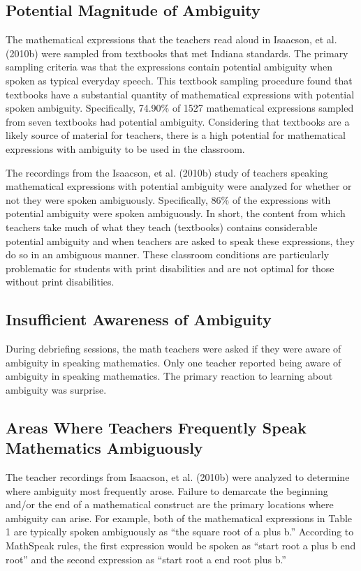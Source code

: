 \documentclass[11.5pt]{sig-alternate} %
\begin{document}
\begin{large}
\subsection*{Potential Magnitude of Ambiguity}
The mathematical expressions that the teachers read aloud in Isaacson, et al. (2010b) were sampled from textbooks that met Indiana standards. The primary sampling criteria was that the expressions contain potential ambiguity when spoken as typical everyday speech. This textbook sampling procedure found that textbooks have a substantial quantity of mathematical expressions with potential spoken ambiguity. Specifically, 74.90\% of 1527 mathematical expressions sampled from seven textbooks had potential ambiguity. Considering that textbooks are a likely source of material for teachers, there is a high potential for mathematical expressions with ambiguity to be used in the classroom.

The recordings from the Isaacson, et al. (2010b) study of teachers speaking mathematical expressions with potential ambiguity were analyzed for whether or not they were spoken ambiguously. Specifically, 86\% of the expressions with potential ambiguity were spoken ambiguously. In short, the content from which teachers take much of what they teach (textbooks) contains considerable potential ambiguity and when teachers are asked to speak these expressions, they do so in an ambiguous manner. These classroom conditions are particularly problematic for students with print disabilities and are not optimal for those without print disabilities. 

\subsection*{Insufficient Awareness of Ambiguity}
During debriefing sessions, the math teachers were asked if they were aware of ambiguity in speaking mathematics. Only one teacher reported being aware of ambiguity in speaking mathematics. The primary reaction to learning about ambiguity was surprise.

\subsection*{Areas Where Teachers Frequently Speak Mathematics Ambiguously}
The teacher recordings from Isaacson, et al. (2010b) were analyzed to determine where ambiguity most frequently arose. Failure to demarcate the beginning and/or the end of a mathematical construct are the primary locations where ambiguity can arise. For example, both of the mathematical expressions in Table 1 are typically spoken ambiguously as “the square root of a plus b.” According to MathSpeak rules, the first expression would be spoken as “start root a plus b end root” and the second expression as “start root a end root plus b.” 


\end{large}
\end{document}

